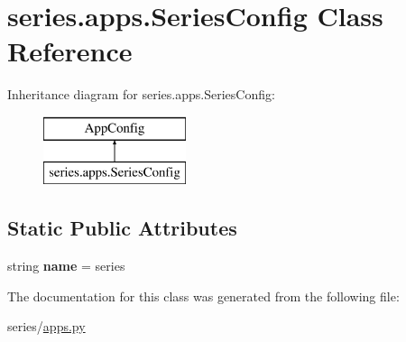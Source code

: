 \hypertarget{classseries_1_1apps_1_1_series_config}{}\section{series.\+apps.\+Series\+Config Class Reference}
\label{classseries_1_1apps_1_1_series_config}
Inheritance diagram for series.\+apps.\+Series\+Config\+:\begin{figure}[H]
\begin{center}
\leavevmode
\includegraphics[height=2.000000cm]{classseries_1_1apps_1_1_series_config}
\end{center}
\end{figure}
\subsection*{Static Public Attributes}
\begin{DoxyCompactItemize}
\item 
\mbox{\label{classseries_1_1apps_1_1_series_config_aedb473b9a090e80ca6d92016a4fd13a0}} 
string {\bfseries name} = \textquotesingle{}series\textquotesingle{}
\end{DoxyCompactItemize}


The documentation for this class was generated from the following file\+:\begin{DoxyCompactItemize}
\item 
series/\mbox{\hyperlink{apps_8py}{apps.\+py}}\end{DoxyCompactItemize}
